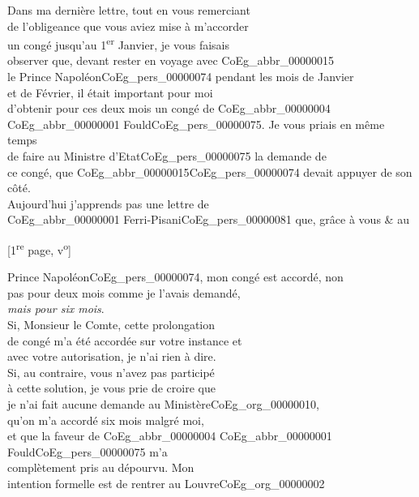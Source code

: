 \documentclass{book}
\begin{document}
Dans ma dernière lettre, tout en vous remerciant\\
de l’obligeance que vous aviez mise à m’accorder\\
un congé jusqu’au 1\textsuperscript{er} Janvier, je vous faisais\\
observer que, devant rester en voyage avec \gls{CoEg_abbr_00000015}\\
le Prince Napoléon\gls{CoEg_pers_00000074} pendant les mois de Janvier\\
et de Février, il était important pour moi\\
d’obtenir pour ces deux mois un congé de \gls{CoEg_abbr_00000004}\\
\gls{CoEg_abbr_00000001} Fould\gls{CoEg_pers_00000075}. Je vous priais en même temps\\
de faire au Ministre d’Etat\gls{CoEg_pers_00000075} la demande de\\
ce congé, que \gls{CoEg_abbr_00000015}\gls{CoEg_pers_00000074} devait appuyer de son\\
côté.\\
\indent Aujourd’hui j’apprends pas une lettre de\\
\gls{CoEg_abbr_00000001} Ferri-Pisani\gls{CoEg_pers_00000081} que, grâce à vous \& au
{\footnotesize \begin{center} [1\textsuperscript{re} page, v\textsuperscript{o}]\end{center}}
\noindent Prince Napoléon\gls{CoEg_pers_00000074}, mon congé est accordé, non\\
pas pour deux mois comme je l’avais demandé,\\
\textit{mais pour six mois}.\\
\indent Si, Monsieur le Comte, cette prolongation\\
de congé m’a été accordée sur votre instance et\\
avec votre autorisation, je n’ai rien à dire.\\
Si, au contraire, vous n’avez pas participé\\
à cette solution, je vous prie de croire que\\
je n’ai fait aucune demande au Ministère\gls{CoEg_org_00000010},\\
qu’on m’a accordé six mois malgré moi,\\
et que la faveur de \gls{CoEg_abbr_00000004} \gls{CoEg_abbr_00000001} Fould\gls{CoEg_pers_00000075} m’a\\
complètement pris au dépourvu. Mon\\
intention formelle est de rentrer au Louvre\gls{CoEg_org_00000002}\\
\end{document}
